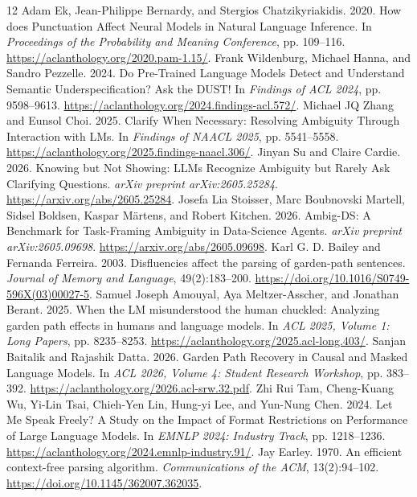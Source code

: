 \documentclass[11pt]{article}
\begin{document}
\begin{thebibliography}{12}
 Adam Ek, Jean-Philippe Bernardy, and Stergios Chatzikyriakidis. 2020. How does Punctuation Affect Neural Models in Natural Language Inference. In \emph{Proceedings of the Probability and Meaning Conference}, pp. 109--116. \url{https://aclanthology.org/2020.pam-1.15/}.
 Frank Wildenburg, Michael Hanna, and Sandro Pezzelle. 2024. Do Pre-Trained Language Models Detect and Understand Semantic Underspecification? Ask the DUST! In \emph{Findings of ACL 2024}, pp. 9598--9613. \url{https://aclanthology.org/2024.findings-acl.572/}.
 Michael JQ Zhang and Eunsol Choi. 2025. Clarify When Necessary: Resolving Ambiguity Through Interaction with LMs. In \emph{Findings of NAACL 2025}, pp. 5541--5558. \url{https://aclanthology.org/2025.findings-naacl.306/}.
 Jinyan Su and Claire Cardie. 2026. Knowing but Not Showing: LLMs Recognize Ambiguity but Rarely Ask Clarifying Questions. \emph{arXiv preprint arXiv:2605.25284}. \url{https://arxiv.org/abs/2605.25284}.
 Josefa Lia Stoisser, Marc Boubnovski Martell, Sidsel Boldsen, Kaspar M{\"a}rtens, and Robert Kitchen. 2026. Ambig-DS: A Benchmark for Task-Framing Ambiguity in Data-Science Agents. \emph{arXiv preprint arXiv:2605.09698}. \url{https://arxiv.org/abs/2605.09698}.
 Karl G. D. Bailey and Fernanda Ferreira. 2003. Disfluencies affect the parsing of garden-path sentences. \emph{Journal of Memory and Language}, 49(2):183--200. \url{https://doi.org/10.1016/S0749-596X(03)00027-5}.
 Samuel Joseph Amouyal, Aya Meltzer-Asscher, and Jonathan Berant. 2025. When the LM misunderstood the human chuckled: Analyzing garden path effects in humans and language models. In \emph{ACL 2025, Volume 1: Long Papers}, pp. 8235--8253. \url{https://aclanthology.org/2025.acl-long.403/}.
 Sanjan Baitalik and Rajashik Datta. 2026. Garden Path Recovery in Causal and Masked Language Models. In \emph{ACL 2026, Volume 4: Student Research Workshop}, pp. 383--392. \url{https://aclanthology.org/2026.acl-srw.32.pdf}.
 Zhi Rui Tam, Cheng-Kuang Wu, Yi-Lin Tsai, Chieh-Yen Lin, Hung-yi Lee, and Yun-Nung Chen. 2024. Let Me Speak Freely? A Study on the Impact of Format Restrictions on Performance of Large Language Models. In \emph{EMNLP 2024: Industry Track}, pp. 1218--1236. \url{https://aclanthology.org/2024.emnlp-industry.91/}.
 Jay Earley. 1970. An efficient context-free parsing algorithm. \emph{Communications of the ACM}, 13(2):94--102. \url{https://doi.org/10.1145/362007.362035}.

\end{thebibliography}
\end{document}
